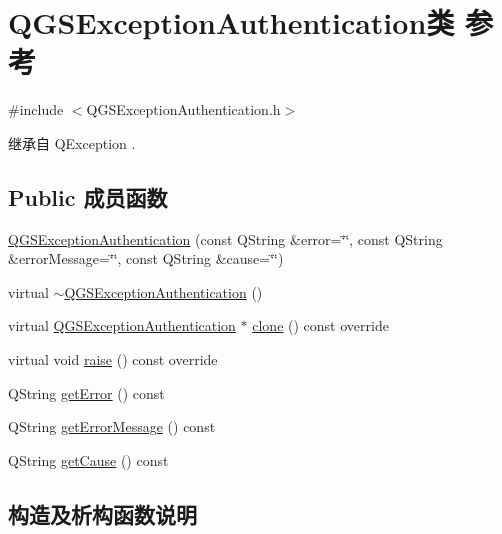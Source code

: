 \hypertarget{class_q_g_s_exception_authentication}{}\section{Q\+G\+S\+Exception\+Authentication类 参考}
\label{class_q_g_s_exception_authentication}


{\ttfamily \#include $<$Q\+G\+S\+Exception\+Authentication.\+h$>$}



继承自 Q\+Exception .

\subsection*{Public 成员函数}
\begin{DoxyCompactItemize}
\item 
\mbox{\hyperlink{class_q_g_s_exception_authentication_a4f643095917c176a5abaa4a26155fd86}{Q\+G\+S\+Exception\+Authentication}} (const Q\+String \&error=\char`\"{}\char`\"{}, const Q\+String \&error\+Message=\char`\"{}\char`\"{}, const Q\+String \&cause=\char`\"{}\char`\"{})
\item 
virtual \mbox{\hyperlink{class_q_g_s_exception_authentication_a3ea673cea41fb7be34074e1f7ae95cd7}{$\sim$\+Q\+G\+S\+Exception\+Authentication}} ()
\item 
virtual \mbox{\hyperlink{class_q_g_s_exception_authentication}{Q\+G\+S\+Exception\+Authentication}} $\ast$ \mbox{\hyperlink{class_q_g_s_exception_authentication_a5e1cf8601b99ea8dc2525ec2063f3744}{clone}} () const override
\item 
virtual void \mbox{\hyperlink{class_q_g_s_exception_authentication_a91971de2b9a68b26c9efc33ae0bcbd2f}{raise}} () const override
\item 
Q\+String \mbox{\hyperlink{class_q_g_s_exception_authentication_a10d66cb1f05cc1f33994a4d35d96f7de}{get\+Error}} () const
\item 
Q\+String \mbox{\hyperlink{class_q_g_s_exception_authentication_a31500db6d2af0e6651d2f49e8b23c5ba}{get\+Error\+Message}} () const
\item 
Q\+String \mbox{\hyperlink{class_q_g_s_exception_authentication_ab0fb7b35c4fbedbc0cd908fea6e6f923}{get\+Cause}} () const
\end{DoxyCompactItemize}


\subsection{构造及析构函数说明}
\mbox{\label{class_q_g_s_exception_authentication_a4f643095917c176a5abaa4a26155fd86}} 

